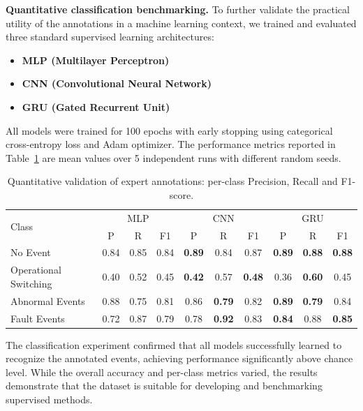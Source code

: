 \documentclass{article}
\begin{document}
\textbf{Quantitative classification benchmarking.} To further validate the practical utility of the annotations in a machine learning context, we trained and evaluated three standard supervised learning architectures:

\begin{itemize}
    \item \textbf{MLP (Multilayer Perceptron)}
    \item \textbf{CNN (Convolutional Neural Network)}
    \item \textbf{GRU (Gated Recurrent Unit)}
\end{itemize}

All models were trained for 100 epochs with early stopping using categorical cross-entropy loss and Adam optimizer. The performance metrics reported in Table~\ref{tab:classification_results} are mean values over 5 independent runs with different random seeds.

\begin{table}[!ht]
\centering
\caption{Quantitative validation of expert annotations: per-class Precision, Recall and F1-score.}
\label{tab:classification_results}
\footnotesize
\begin{tabular}{l |ccc |ccc |ccc}
\multirow{2}{*}{Class} & 
\multicolumn{3}{c|}{MLP} & 
\multicolumn{3}{c|}{CNN} & 
\multicolumn{3}{c}{GRU} \\
 & P     & R     & F1    & P     & R     & F1    & P     & R     & F1\\
 \hline
No Event               & 0.84 & 0.85 & 0.84 & \textbf{0.89} & 0.84 & 0.87 & \textbf{0.89} & \textbf{0.88} & \textbf{0.88} \\
Operational Switching  & 0.40 & 0.52 & 0.45 & \textbf{0.42} & 0.57 & \textbf{0.48} & 0.36 & \textbf{0.60} & 0.45 \\
Abnormal Events        & 0.88 & 0.75 & 0.81 & 0.86 & \textbf{0.79} & 0.82 & \textbf{0.89} & \textbf{0.79} & 0.84 \\
Fault Events           & 0.72 & 0.87 & 0.79 & 0.78 & \textbf{0.92} & 0.83 & \textbf{0.84} & 0.88 & \textbf{0.85} \\
\end{tabular}
\end{table}

The classification experiment confirmed that all models successfully learned to recognize the annotated events, achieving performance significantly above chance level. While the overall accuracy and per-class metrics varied, the results demonstrate that the dataset is suitable for developing and benchmarking supervised methods.
\end{document}
